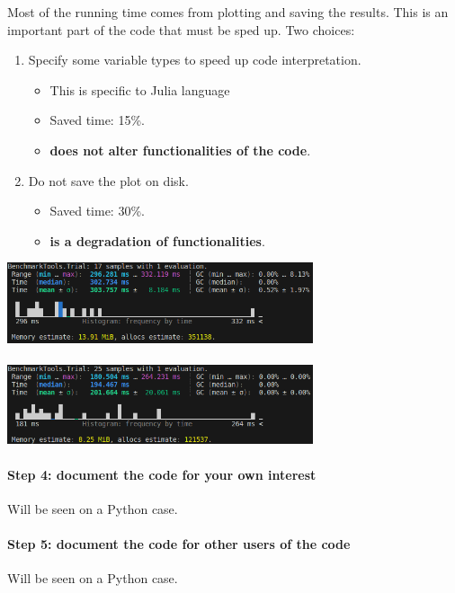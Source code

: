 \documentclass[11pt]{article}
\begin{document}
						Most of the running time comes from plotting and saving the results.
						This is an important part of the code that must be sped up. Two choices: \\
						\begin{minipage}{.5\textwidth}
									\begin{enumerate}
										\item Specify some variable types to speed up code interpretation.
										\begin{itemize}
											\item This is specific to Julia language
											\item Saved time: 15\%.
											\item \textbf{does not alter functionalities of the code}.
										\end{itemize}

										\item Do not save the plot on disk.
										\begin{itemize}
											\item Saved time: 30\%.
											\item \textbf{is a degradation of functionalities}.
										\end{itemize}
									\end{enumerate}
						\end{minipage}
						\begin{minipage}{1cm}
									\mbox{}
						\end{minipage}
						\begin{minipage}{.45\textwidth}
									\includegraphics[width=9cm]{figures/diff_equation/benchmark - improved types - step 3} \\
									\mbox{} \\
									\includegraphics[width=9cm]{figures/diff_equation/benchmark - no_disk_write - step 3}
						\end{minipage}

				\paragraph{Step 4: document the code for your own interest}
                    Will be seen on a Python case.

				\paragraph{Step 5: document the code for other users of the code}
					Will be seen on a Python case.
\end{document}
